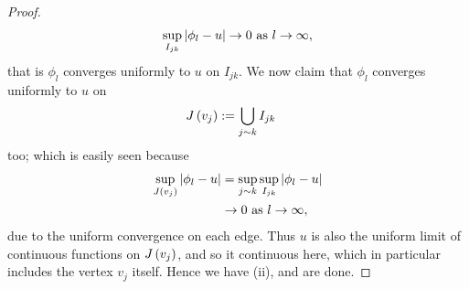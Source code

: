 \begin{proof}
\begin{align*}
		\sup_{I_{jk}}\left\lvert \phi_l - u \right\rvert\rightarrow0 \ \text{as} \ l \rightarrow\infty,
	\end{align*}
	that is $\phi_l$ converges uniformly to $u$ on $I_{jk}$.
	We now claim that $\phi_l$ converges uniformly to $u$ on
	\begin{align*}
		J\left( v_j \right) &:= \bigcup_{j\sim k}I_{jk}
	\end{align*}
	too; which is easily seen because
	\begin{align*}
		\sup_{J\left( v_j \right)}\left\lvert \phi_l - u \right\rvert &= \sup_{j\sim k}\sup_{I_{jk}}\left\lvert \phi_l - u \right\rvert \\
		&\rightarrow0 \ \text{as} \ l \rightarrow\infty,
	\end{align*}
	due to the uniform convergence on each edge.
	Thus $u$ is also the uniform limit of continuous functions on $J\left( v_j \right)$, and so it continuous here, which in particular includes the vertex $v_j$ itself.
	Hence we have (ii), and are done.
\end{proof}